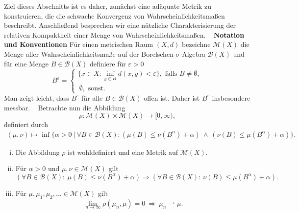 Ziel dieses Abschnitts ist es daher, zunächst eine adäquate Metrik zu konstruieren, die die schwache Konvergenz von Wahrscheinlichkeitsmaßen beschreibt. 
Anschließend besprechen wir eine nützliche Charakterisierung der relativen Kompaktheit einer Menge von Wahrscheinlichkeitsmaßen. 
\newline \ \newline
\textbf{Notation und Konventionen} \newline 
Für einen metrischen Raum $(X,d)$ bezeichne $\mathcal{M}(X)$ die Menge aller Wahrscheinlichkeitsmaße auf der Borelschen $\sigma$-Algebra $\mathcal{B}(X)$ und für eine Menge $B \in \mathcal{B}(X)$ definiere für $\varepsilon > 0$
$$
    B^{\varepsilon} = \begin{cases}
         \{x \in X: \inf_{y \in B}d(x,y) < \varepsilon\}, \text{ falls } B \neq \emptyset, \\\ 
        \emptyset, \text{ sonst.}
    \end{cases}
$$
Man zeigt leicht, dass $B^{\varepsilon}$ für alle $B\in \mathcal{B}(X)$ offen ist. Daher ist $B^{\varepsilon}$ insbesondere messbar. 
\newline \ \newline 
Betrachte nun die Abbildung 
$$
    \rho: \mathcal{M}(X) \times \mathcal{M}(X) \to [0, \infty),
$$
definiert durch
\begin{align}
    (\mu, \nu) \mapsto \inf\big\{\alpha > 0 \ | \ \forall B \in \mathcal{B}(X): (\mu(B) \leq \nu(B^{\alpha}) + \alpha) \ \land \ (\nu(B) \leq \mu(B^{\alpha}) + \alpha) \big\}.
\end{align}
\begin{proposition}
    \begin{enumerate}[(i)]
        \item Die Abbildung $\rho$ ist wohldefiniert und eine Metrik auf $\mathcal{M}(X)$. 
        \item Für $\alpha > 0$ und $\mu, \nu \in \mathcal{M}(X)$ gilt
        $$
            (\forall B \in \mathcal{B}(X): \ \mu(B) \leq \nu(B^{\alpha}) + \alpha) \Rightarrow (\forall B \in \mathcal{B}(X): \ \nu(B) \leq \mu(B^{\alpha}) + \alpha).
        $$
        \item Für $\mu, \mu_1, \mu_2,... \in \mathcal{M}(X)$ gilt 
        $$
            \lim_{n \to \infty} \rho(\mu_n, \mu) = 0 \ \Rightarrow \ \mu_n \rightharpoonup \mu. 
        $$
    \end{enumerate}
\end{proposition}

